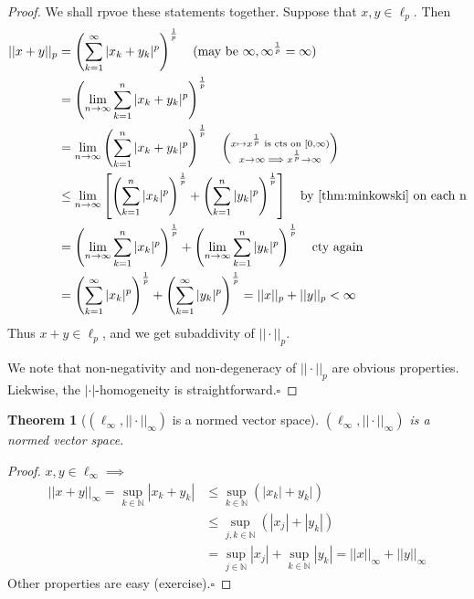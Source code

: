 \documentclass[11pt, oneside]{book}
\theoremstyle{break}
\newtheorem{thm}{Theorem}[section]
\newtheorem*{proof}{Proof}
\newcommand{\bb}[1]{\mathbb{#1}}			%
\newcommand{\qed}{\hfill\ensuremath{\square}}	%
\begin{document}
\begin{proof}
	We shall rpvoe these statements together. Suppose that $x, y \in \ell_p$. Then
	\begin{align*}
		||x + y||_p &= \left( \sum_{k=1}^{\infty} |x_k + y_k|^p \right)^{\frac{1}{p}} \quad \text{(may be $\infty, \infty^{\frac{1}{p}} = \infty$)} \\
				&= \left( \lim_{n \to \infty} \sum_{k=1}^{n} |x_k + y_k|^p \right)^{\frac{1}{p}} \\
				&= \lim_{n \to \infty} \left( \sum_{k=1}^{n} |x_k + y_k|^p \right)^{\frac{1}{p}} \quad \left(\substack{x \mapsto x^{\frac{1}{p}} \text{ is cts on } [0, \infty) \\ x \to \infty \implies x^{\frac{1}{p}} \to \infty} \right) \\
				&\leq \lim_{n \to \infty} \left[ \left( \sum_{k=1}^{n} |x_k|^p \right)^{\frac{1}{p}} + \left( \sum_{k=1}^{n} |y_k|^p \right)^{\frac{1}{p}} \right] \quad \text{by \autoref{thm:minkowski} on each n} \\
				&= \left( \lim_{n \to \infty} \sum_{k=1}^{n} |x_k|^p \right)^{\frac{1}{p}} + \left( \lim_{n \to \infty} \sum_{k=1}^{n} |y_k|^p \right)^{\frac{1}{p}} \quad \text{cty again} \\
				&= \left( \sum_{k=1}^{\infty} |x_k|^p \right)^{\frac{1}{p}} + \left( \sum_{k=1}^{\infty} |y_k|^p \right)^{\frac{1}{p}} = ||x||_p + ||y||_p < \infty
	\end{align*}
	 Thus $x + y \in \ell_p$, and we get subaddivity of $||\cdot||_p$.

	 We note that non-negativity and non-degeneracy of $||\cdot||_p$ are obvious properties. Liekwise, the $|\cdot|$-homogeneity is straightforward.\qed
\end{proof}

\begin{thm}[$(\ell_\infty, ||\cdot||_\infty)$ is a normed vector space]
	$(\ell_\infty, ||\cdot||_\infty)$ is a normed vector space.
\end{thm}

\begin{proof}
	$x, y \in \ell_\infty \implies$
	\begin{align*}
		||x + y||_\infty = \sup_{k \in \bb{N}} |x_k + y_k| &\leq \sup_{k \in \bb{N}} (|x_k| + y_k|) \\
				&\leq \sup_{j, k \in \bb{N}} (|x_j| + |y_k|) \\
				&= \sup_{j \in \bb{N}} |x_j| + \sup_{k \in \bb{N}} |y_k| = ||x||_\infty + ||y||_\infty
	\end{align*}
	Other properties are easy (exercise).\qed
\end{proof}
\end{document}
